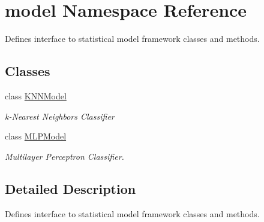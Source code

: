 \hypertarget{namespacemodel}{}\section{model Namespace Reference}
\label{namespacemodel}


Defines interface to statistical model framework classes and methods.  


\subsection*{Classes}
\begin{DoxyCompactItemize}
\item 
class \mbox{\hyperlink{classmodel_1_1_k_n_n_model}{K\+N\+N\+Model}}
\begin{DoxyCompactList}\small\item\em k-\/\+Nearest Neighbors Classifier \end{DoxyCompactList}\item 
class \mbox{\hyperlink{classmodel_1_1_m_l_p_model}{M\+L\+P\+Model}}
\begin{DoxyCompactList}\small\item\em Multilayer Perceptron Classifier. \end{DoxyCompactList}\end{DoxyCompactItemize}


\subsection{Detailed Description}
Defines interface to statistical model framework classes and methods. 